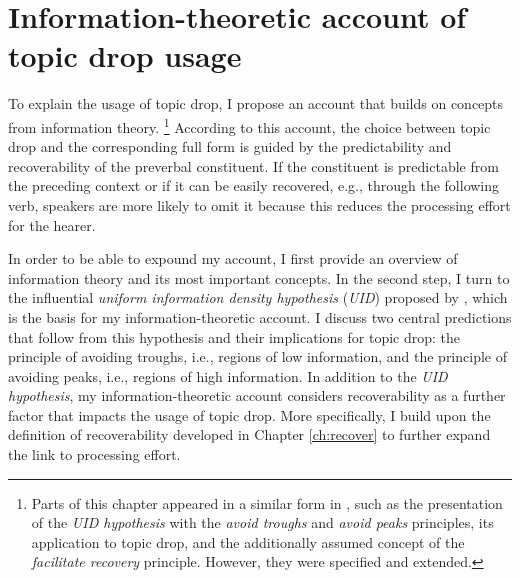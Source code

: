 \chapter{Information-theoretic account of topic drop usage}
\label{ch:infotheory}

To explain the usage of topic drop, I propose an account that builds on concepts from information theory.%
\footnote{Parts of this chapter appeared in a similar form in \citet{schafer2021}, such as the presentation of the \textit{UID hypothesis} with the \textit{avoid troughs} and \textit{avoid peaks} principles, its application to topic drop, and the additionally assumed concept of the \textit{facilitate recovery} principle.
However, they were specified and extended.}
%
According to this account, the choice between topic drop and the corresponding full form is guided by the predictability  and recoverability of the preverbal constituent.
If the constituent is predictable from the preceding context or if it can be easily recovered,  e.g., through the following verb, speakers are more likely to omit it because this reduces the processing effort for the hearer. 

In order to be able to expound my account, I first provide an overview of information theory and its most important concepts.
In the second step, I turn to the influential \textit{uniform information density hypothesis} (\textit{UID}) proposed by \citet{levy.jaeger2007}, which is the basis for my information-theoretic account.
I discuss two central predictions that follow from this hypothesis and their implications for topic drop: the principle of avoiding troughs, i.e., regions of low information, and the principle of avoiding peaks, i.e., regions of high information.
In addition to the \textit{UID hypothesis}, my information-theoretic account considers recoverability  as a further factor that impacts the usage of topic drop.
More specifically, I build upon the definition of recoverability developed in Chapter \ref{ch:recover} to further expand the link to processing effort.  


